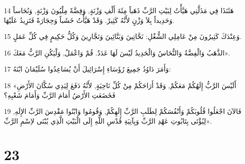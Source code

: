 \par 14 هَئَنَذَا فِي مَذَلَّتِي هَيَّأْتُ لِبَيْتِ الرَّبِّ ذَهَباً مِئَةَ أَلْفِ وَزْنَةٍ, وَفِضَّةً مِلْيُونَ وَزْنَةٍ, وَنُحَاساً وَحَدِيداً بِلاَ وَزْنٍ لأَنَّهُ كَثِيرٌ. وَقَدْ هَيَّأْتُ خَشَباً وَحِجَارَةً فَتَزِيدُ عَلَيْهَا.
\par 15 وَعِنْدَكَ كَثِيرُونَ مِنْ عَامِلِي الشُّغْلِ: نَحَّاتِينَ وَبَنَّائِينَ وَنَجَّارِينَ وَكُلُّ حَكِيمٍ فِي كُلِّ عَمَلٍ.
\par 16 الذَّهَبُ وَالْفِضَّةُ وَالنُّحَاسُ وَالْحَدِيدُ لَيْسَ لَهَا عَدَدٌ. قُمْ وَاعْمَلْ, وَلْيَكُنِ الرَّبُّ مَعَكَ».
\par 17 وَأَمَرَ دَاوُدُ جَمِيعَ رُؤَسَاءِ إِسْرَائِيلَ أَنْ يُسَاعِدُوا سُلَيْمَانَ ابْنَهُ:
\par 18 «أَلَيْسَ الرَّبُّ إِلَهُكُمْ مَعَكُمْ, وَقَدْ أَرَاحَكُمْ مِنْ كُلِّ نَاحِيَةٍ, لأَنَّهُ دَفَعَ لِيَدِي سُكَّانَ الأَرْضِ فَخَضَعَتِ الأَرْضُ أَمَامَ الرَّبِّ وَأَمَامَ شَعْبِهِ؟
\par 19 فَالآنَ اجْعَلُوا قُلُوبَكُمْ وَأَنْفُسَكُمْ لِطَلَبِ الرَّبِّ إِلَهِكُمْ, وَقُومُوا وَابْنُوا مَقْدِسَ الرَّبِّ الإِلَهِ, لِيُؤْتَى بِتَابُوتِ عَهْدِ الرَّبِّ وَبِآنِيَةِ قُدْسِ اللَّهِ إِلَى الْبَيْتِ الَّذِي يُبْنَى لاِسْمِ الرَّبِّ».

\chapter{23}

